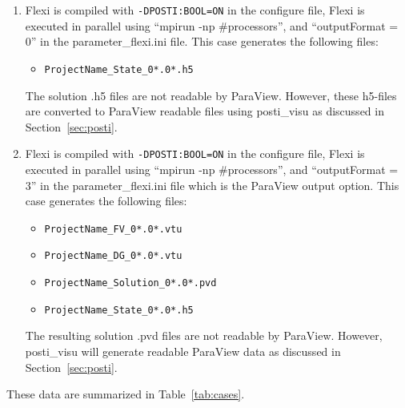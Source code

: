 \begin{appendices}
\begin{enumerate}
\item Flexi is compiled with \verb|-DPOSTI:BOOL=ON| in the configure file, Flexi is executed in parallel  using ``mpirun -np \#processors'', and ``outputFormat = 0'' in the parameter\_flexi.ini file. This case generates the following files:
 \begin{itemize}
  \item \verb|ProjectName_State_0*.0*.h5|
 \end{itemize}
\noindent  The solution .h5 files are not readable by ParaView. However, these h5-files are converted to ParaView readable files using posti\_visu as discussed in Section~\ref{sec:posti}.

\item Flexi is compiled with \verb|-DPOSTI:BOOL=ON| in the configure file, Flexi is executed in parallel  using ``mpirun -np \#processors'', and ``outputFormat = 3'' in the parameter\_flexi.ini file which is the ParaView output option. This case generates the following files:
 \begin{itemize}
  \item \verb|ProjectName_FV_0*.0*.vtu|
  \item \verb|ProjectName_DG_0*.0*.vtu|
  \item \verb|ProjectName_Solution_0*.0*.pvd|
  \item \verb|ProjectName_State_0*.0*.h5|
 \end{itemize}
\noindent  The resulting solution .pvd files are not readable by ParaView.  However, posti\_visu will generate readable ParaView data as discussed in Section~\ref{sec:posti}.

\end{enumerate}
\endgroup
\noindent These data are summarized in Table~\ref{tab:cases}.


\end{appendices}
